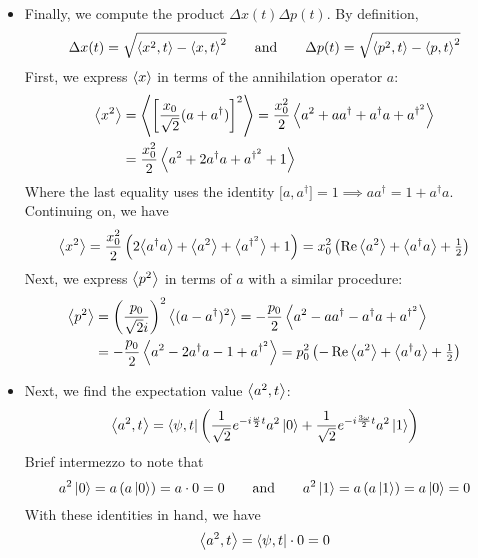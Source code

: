 \documentclass[11pt, a4paper]{article}
\newcommand{\eqtext}[1]{\qquad \text{#1} \qquad}
\newcommand{\evb}[1]{\big \langle {#1} \big \rangle}  %
\begin{document}
\begin{itemize}
	\item Finally, we compute the product $ \Delta x(t) \Delta p(t) $. By definition,
	\begin{equation*}
		\Delta x(t) = \sqrt{\ev{x^{2}, t} - \ev{x, t}^{2}} \eqtext{and} \Delta p(t) = \sqrt{\ev{p^{2}, t} - \ev{p, t}^{2}}
	\end{equation*}
	First, we express $ \ev{x} $ in terms of the annihilation operator $ a $:
	\begin{align*}
		\ev{x^{2}} &= \ev{\left[\frac{x_{0}}{\sqrt{2}}(a + a^{\dagger})\right]^{2}} = \frac{x_{0}^{2}}{2}\ev{a^{2} + aa^{\dagger} + a^{\dagger}a + a^{\dagger^{2}}}\\
		&= \frac{x_{0}^{2}}{2}\ev{a^{2} + 2a^{\dagger}a + a^{\dagger^{2}}+1}
	\end{align*}
	Where the last equality uses the identity $ \big[a, a^{\dagger}\big] = 1 \implies aa^{\dagger} = 1 + a^{\dagger}a $. Continuing on, we have
	\begin{equation*}
		\ev{x^{2}} = \frac{x_{0}^{2}}{2}\left(2\evb{a^{\dagger}a} + \ev{a^{2}}+ \evb{a^{\dagger^{2}}}+1\right) = x_{0}^{2}\left(\Re\ev{a^{2}} + \evb{a^{\dagger}a} + \tfrac{1}{2}\right)
	\end{equation*}
	Next, we express $ \ev{p^{2}} $ in terms of $ a $ with a similar procedure:
	\begin{align*}
		\ev{p^{2}} &= \left(\frac{p_{0}}{\sqrt{2}i}\right)^{2}\ev{(a - a^{\dagger})^{2}} = -\frac{p_{0}}{2}\ev{a^{2}- aa^{\dagger} - a^{\dagger}a + a^{\dagger^{2}}}\\
		& = -\frac{p_{0}}{2} \ev{a^{2} - 2a^{\dagger}a -1 + a^{\dagger^{2}}} = p_{0}^{2}\left(-\Re \ev{a^{2}} + \evb{a^{\dagger}a} + \tfrac{1}{2}\right)
	\end{align*}
	\item Next, we find the expectation value $ \ev{a^{2}, t} $:
	\begin{equation*}
		\ev{a^{2}, t} = \bra{\psi, t}\left(\frac{1}{\sqrt{2}}e^{-i\frac{\omega}{2}t}a^{2}\ket{0} + \frac{1}{\sqrt{2}}e^{-i\frac{3\omega}{2}t}a^{2}\ket{1} \right) 
	\end{equation*}
	Brief intermezzo to note that
	\begin{equation*}
		a^{2}\ket{0} = a\left(a\ket{0}\right) = a \cdot 0 = 0 \eqtext{and} a^{2}\ket{1} = a\left(a\ket{1}\right) = a\ket{0} = 0
	\end{equation*}
	With these identities in hand, we have
	\begin{equation*}
		\ev{a^{2}, t} = \bra{\psi, t} \cdot 0 = 0
	\end{equation*}
	

\end{itemize}
\end{document}
